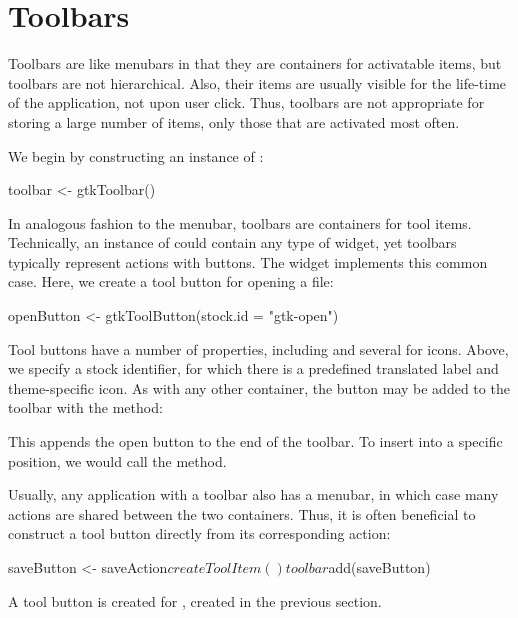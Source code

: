\section{Toolbars}
\label{sec:RGtk2:toolbars}

Toolbars are like menubars in that they are containers for
activatable items, but toolbars are not hierarchical. Also, their
items are usually visible for the life-time of the application, not
upon user click. Thus, toolbars are not appropriate for storing a
large number of items, only those that are activated most often.

We begin by constructing an instance of :
\begin{Schunk}
\begin{Sinput}
 toolbar <- gtkToolbar()
\end{Sinput}
\end{Schunk}

In analogous fashion to the menubar, toolbars are containers for tool
items. Technically, an instance of  could contain
any type of widget, yet toolbars typically represent actions
with buttons. The  widget implements this common
case.  Here, we create a tool button for opening a file:
\begin{Schunk}
\begin{Sinput}
 openButton <- gtkToolButton(stock.id = "gtk-open") 
\end{Sinput}
\end{Schunk}
%
Tool buttons have a number of properties, including  and
several for icons. Above, we specify a stock identifier,
for which there is a predefined translated label and theme-specific icon.
As with any other container, the button may be added to the toolbar with
the  method:
\begin{Schunk}
\end{Schunk}
%
This appends the open button to the end of the toolbar. To insert into
a specific position, we would call the  method.

Usually, any application with a toolbar also has a menubar, in which
case many actions are shared between the two containers. Thus, it is
often beneficial to construct a tool button directly from its
corresponding action:
\begin{Schunk}
\begin{Sinput}
 saveButton <- saveAction$createToolItem()
 toolbar$add(saveButton)
\end{Sinput}
\end{Schunk}
%
A tool button is created for , created in the
previous section.

